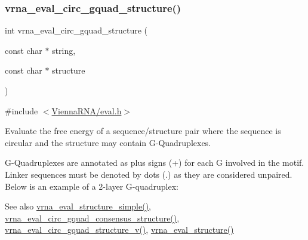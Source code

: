 \subsubsection{\texorpdfstring{vrna\_eval\_circ\_gquad\_structure()}{vrna\_eval\_circ\_gquad\_structure()}}
{\footnotesize\ttfamily int vrna\+\_\+eval\+\_\+circ\+\_\+gquad\+\_\+structure (\begin{DoxyParamCaption}\item[{const char $\ast$}]{string,  }\item[{const char $\ast$}]{structure }\end{DoxyParamCaption})}



{\ttfamily \#include $<$\mbox{\hyperlink{eval_8h}{Vienna\+R\+N\+A/eval.\+h}}$>$}



Evaluate the free energy of a sequence/structure pair where the sequence is circular and the structure may contain G-\/\+Quadruplexes. 

G-\/\+Quadruplexes are annotated as plus signs (\textquotesingle{}+\textquotesingle{}) for each G involved in the motif. Linker sequences must be denoted by dots (\textquotesingle{}.\textquotesingle{}) as they are considered unpaired. Below is an example of a 2-\/layer G-\/quadruplex\+: 
\begin{DoxyCode}{0}
\end{DoxyCode}


\begin{DoxySeeAlso}{See also}
\mbox{\hyperlink{group__eval_ga7e5273464b775d4130245681312c1369}{vrna\+\_\+eval\+\_\+structure\+\_\+simple()}}, \mbox{\hyperlink{group__eval_gac673ebb9ae2a29f54d201e2ac5b85540}{vrna\+\_\+eval\+\_\+circ\+\_\+gquad\+\_\+consensus\+\_\+structure()}}, \mbox{\hyperlink{group__eval_gab96a6c59923ff06c35f8c2fd2c239727}{vrna\+\_\+eval\+\_\+circ\+\_\+gquad\+\_\+structure\+\_\+v()}}, \mbox{\hyperlink{group__eval_ga58f199f1438d794a265f3b27fc8ea631}{vrna\+\_\+eval\+\_\+structure()}}
\end{DoxySeeAlso}

